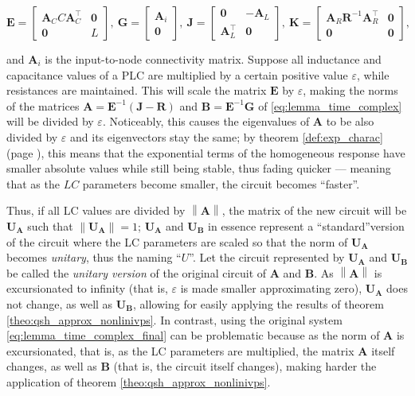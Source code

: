 \begin{equation} \mathbf{E} = \left[\begin{array}{cc} \mathbf{A}_C C \mathbf{A}_C^\intercal & \mathbf{0}\\[1mm] \mathbf{0} & L \end{array}\right],\ \mathbf{G} = \left[\begin{array}{c} \mathbf{A}_i \\ \mathbf{0} \end{array}\right],\ \mathbf{J} = \left[\begin{array}{cc} \mathbf{0} & -\mathbf{A}_L \\[1mm] \mathbf{A}_L^\intercal & \mathbf{0} \end{array}\right],\ \mathbf{K} = \left[\begin{array}{cc} \mathbf{A}_R \mathbf{R}^{-1}  \mathbf{A}_R^\intercal & \mathbf{0} \\[1mm] \mathbf{0} & \mathbf{0} \end{array}\right] ,\end{equation}

	\noindent and $\mathbf{A}_i$ is the input-to-node connectivity matrix. Suppose all inductance and capacitance values of a PLC are multiplied by a certain positive value $\varepsilon$, while resistances are maintained. This will scale the matrix $\mathbf{E}$ by $\varepsilon$, making the norms of the matrices $\mathbf{A} = \mathbf{E}^{-1}\left(\mathbf{J-R}\right)$ and $\mathbf{B} = \mathbf{E}^{-1}\mathbf{G}$ of \eqref{eq:lemma_time_complex} will be divided by $\varepsilon$. Noticeably, this causes the eigenvalues of $\mathbf{A}$ to be also divided by $\varepsilon$ and its eigenvectors stay the same; by theorem \ref{def:exp_charac} (page \pageref{def:exp_charac}), this means that the exponential terms of the homogeneous response have smaller absolute values while still being stable, thus fading quicker — meaning that as the $LC$ parameters become smaller, the circuit becomes ``faster''.

	Thus, if all LC values are divided by $\left\lVert \mathbf{A}\right\rVert$, the matrix of the new circuit will be $\mathbf{U_A}$ such that $\left\lVert \mathbf{U_A}\right\rVert = 1$; $\mathbf{U_A}$ and $\mathbf{U_B}$ in essence represent a ``standard''version of the circuit where the LC parameters are scaled so that the norm of $\mathbf{U_A}$ becomes \textit{unitary}, thus the naming ``$U$''. Let the circuit represented by $\mathbf{U_A}$ and $\mathbf{U_B}$ be called the \textit{unitary version} of the original circuit of $\mathbf{A}$ and $\mathbf{B}$. As $\left\lVert \mathbf{A}\right\rVert$ is excursionated to infinity (that is, $\varepsilon$ is made smaller approximating zero), $\mathbf{U_A}$ does not change, as well as $\mathbf{U_B}$, allowing for easily applying the results of theorem \ref{theo:qsh_approx_nonlinivps}. In contrast, using the original system \eqref{eq:lemma_time_complex_final} can be problematic because as the norm of $\mathbf{A}$ is excursionated, that is, as the LC parameters are multiplied, the matrix $\mathbf{A}$ itself changes, as well as $\mathbf{B}$ (that is, the circuit itself changes), making harder the application of theorem \ref{theo:qsh_approx_nonlinivps}.

